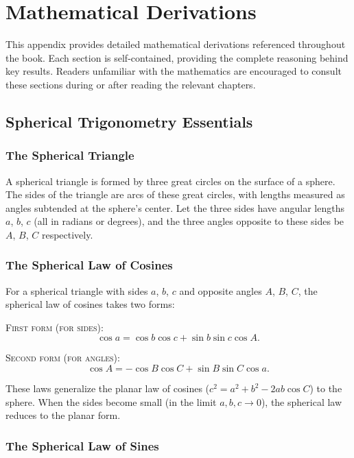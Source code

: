 \chapter{Mathematical Derivations}
\label{app:mathematical-derivations}

This appendix provides detailed mathematical derivations referenced throughout the book. Each section is self-contained, providing the complete reasoning behind key results. Readers unfamiliar with the mathematics are encouraged to consult these sections during or after reading the relevant chapters.

\section{Spherical Trigonometry Essentials}

\subsection*{The Spherical Triangle}

A spherical triangle is formed by three great circles on the surface of a sphere. The sides of the triangle are arcs of these great circles, with lengths measured as angles subtended at the sphere's center. Let the three sides have angular lengths $a$, $b$, $c$ (all in radians or degrees), and the three angles opposite to these sides be $A$, $B$, $C$ respectively.

\subsection*{The Spherical Law of Cosines}

For a spherical triangle with sides $a$, $b$, $c$ and opposite angles $A$, $B$, $C$, the spherical law of cosines takes two forms:

\textsc{First form (for sides):}
\[
  \cos a = \cos b \cos c + \sin b \sin c \cos A.
\]

\textsc{Second form (for angles):}
\[
  \cos A = -\cos B \cos C + \sin B \sin C \cos a.
\]

These laws generalize the planar law of cosines ($c^2 = a^2 + b^2 - 2ab\cos C$) to the sphere. When the sides become small (in the limit $a, b, c \to 0$), the spherical law reduces to the planar form.

\subsection*{The Spherical Law of Sines}

